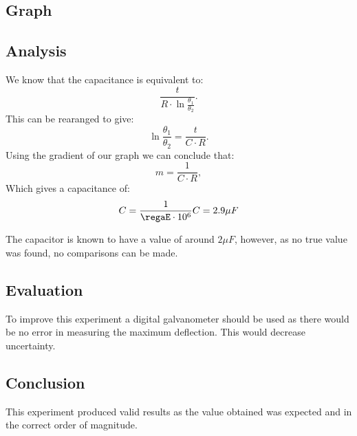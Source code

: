 \subsection{Graph}

\begin{figure}[H]
  \centering
\end{figure}

\subsection{Analysis}
We know that the capacitance is equivalent to:
\begin{equation}
  \frac{t}{R \cdot \ln{\frac{\theta_1}{\theta_2}}}.
\end{equation}
This can be rearanged to give:
\begin{equation}
  \ln{\frac{\theta_1}{\theta_2}} = \frac{t}{C \cdot R}.
\end{equation}
Using the gradient of our graph we can conclude that:
\begin{equation}
  m = \frac{1}{C \cdot R},
\end{equation}
Which gives a capacitance of:
\begin{equation}
  C = \frac{1}{\regaE \cdot 10^6} \\
  C = 2.9 \mu F
\end{equation}

The capacitor is known to have a value of around $2\mu F$, however, as no true value was found, no comparisons can be made.

\subsection{Evaluation}
To improve this experiment a digital galvanometer should be used as there would be no error in measuring the maximum deflection. This would decrease uncertainty.

\subsection{Conclusion}
This experiment produced valid results as the value obtained was expected and in the correct order of magnitude.
